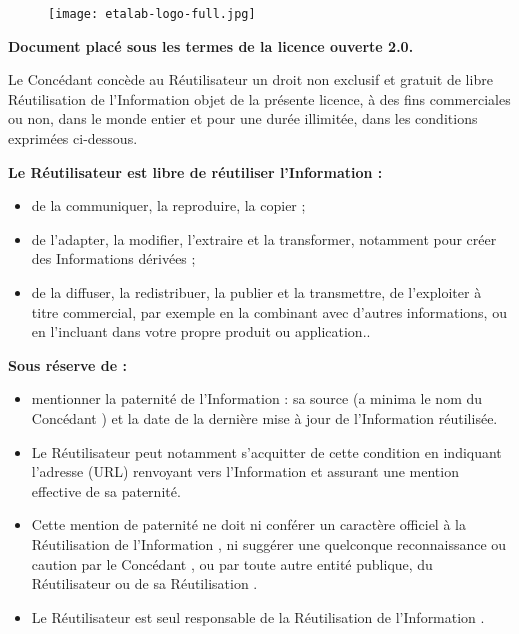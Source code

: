 \begin{center}
\begin{figure}
    \centering
    \texttt{[image: etalab-logo-full.jpg]}
    \label{fig:licence}
\end{figure}

\bigskip

\bigskip

\textbf{Document placé sous les termes de la licence ouverte 2.0.}

\bigskip

Le \og Concédant \fg{} concède au \og Réutilisateur \fg{} un droit non exclusif et gratuit de libre  \og Réutilisation \fg{} de l'\og Information \fg{} objet de la présente licence, à des fins commerciales ou non, dans le monde entier et pour une durée illimitée, dans les conditions exprimées ci-dessous.

\end{center}

\bigskip

\textbf{Le \og Réutilisateur \fg{} est libre de réutiliser l'\og Information \fg{} :}

    \begin{itemize}
        \item de la communiquer, la reproduire, la copier ;
        \item de l'adapter, la modifier, l'extraire et la transformer, notamment pour créer des \og Informations dérivées \fg{} ;
        \item de la diffuser, la redistribuer, la publier et la transmettre, de l'exploiter à titre commercial, par exemple en la combinant avec d'autres informations, ou en l'incluant dans votre propre produit ou application..
    \end{itemize}

\bigskip

\textbf{Sous réserve de :}

\begin{itemize}
        \item mentionner la paternité de l'\og Information \fg{} : sa source (a minima le nom du \og Concédant \fg{}) et la date de la dernière mise à jour de l'\og Information \fg{} réutilisée. 
        \item Le \og Réutilisateur \fg{} peut notamment s'acquitter de cette condition en indiquant l'adresse (URL) renvoyant vers \og l'Information \fg{} et assurant une mention effective de sa paternité.
        \item Cette mention de paternité ne doit ni conférer un caractère officiel à la \og Réutilisation \fg{} de l'\og Information \fg{}, ni suggérer une quelconque reconnaissance ou caution par le \og Concédant \fg{}, ou par toute autre entité publique, du \og Réutilisateur \fg{} ou de sa \og Réutilisation \fg{}.
        \item Le \og Réutilisateur \fg{} est seul responsable de la \og Réutilisation \fg{} de l'\og Information \fg{}.
\end{itemize}

